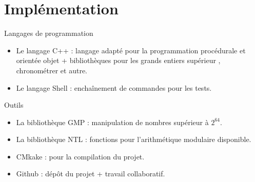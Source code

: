 	\section{Implémentation}
		\begin{frame}
		\begin{block}{Langages de programmation } 
		\begin{itemize}
		\item Le langage C++ : langage adapté pour la programmation procédurale et orientée objet +  bibliothèques pour les grands entiers supérieur , chronométrer et autre.\\
		\item Le langage Shell : enchaînement de commandes pour les tests.
		\end{itemize} \pause
		\vspace{2em}		
		\end{block}
		
		\begin{block}{Outils}
		\begin{itemize}
			\item La bibliothèque GMP : manipulation de nombres supérieur à $2^{64}$.
			\item La bibliothèque NTL : fonctions pour l'arithmétique modulaire disponible.
			\item CMkake : pour la compilation du projet.
			\item Github : dépôt du projet + travail collaboratif.
		\end{itemize}
		\end{block}
		\end{frame}
